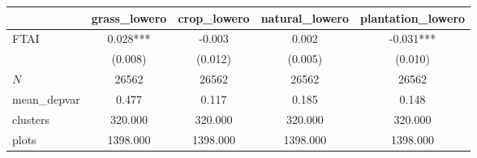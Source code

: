 {
\def\sym#1{\ifmmode^{#1}\else\(^{#1}\)\fi}
\begin{tabular}{l*{4}{c}}
\toprule
          &\multicolumn{1}{c}{grass\_lowero}&\multicolumn{1}{c}{crop\_lowero}&\multicolumn{1}{c}{natural\_lowero}&\multicolumn{1}{c}{plantation\_lowero}\\
\midrule
FTAI      &    0.028***&   -0.003   &    0.002   &   -0.031***\\
          &  (0.008)   &  (0.012)   &  (0.005)   &  (0.010)   \\
\midrule
\(N\)     &    26562   &    26562   &    26562   &    26562   \\
mean\_depvar&    0.477   &    0.117   &    0.185   &    0.148   \\
clusters  &  320.000   &  320.000   &  320.000   &  320.000   \\
plots     & 1398.000   & 1398.000   & 1398.000   & 1398.000   \\
\bottomrule
\end{tabular}
}
